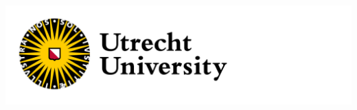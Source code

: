 \documentclass{scripts/preamble}
\begin{document}
	\begin{titlepage} %
		\noindent
		\begin{minipage}{0.4\textwidth}
			\includegraphics[width=\linewidth]{images/uulogo} %
		\end{minipage}
	
	    \par\vspace{0.3cm}
	    

\end{titlepage}
\end{document}
